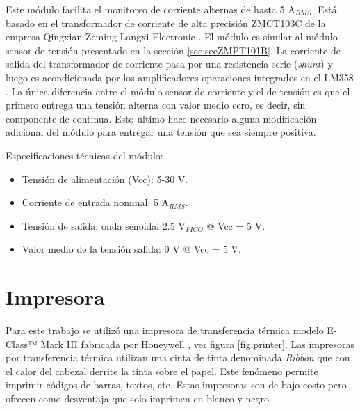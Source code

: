Este módulo facilita el monitoreo de corriente alternas de hasta 5 A$_{RMS}$. Está basado en el transformador de corriente de alta precisión ZMCT103C de la empresa Qingxian Zeming Langxi Electronic \citep{ZMCT103C_b}. El módulo es similar al módulo sensor de tensión presentado en la sección \ref{sec:secZMPT101B}. La corriente de salida del transformador de corriente pasa por una resistencia serie (\textit{shunt}) y luego es acondicionada por los amplificadores operaciones integrados en el LM358 \citep{LM358}. La única diferencia entre el módulo sensor de corriente y el de tensión es que el primero entrega una tensión alterna con valor medio cero, es decir, sin componente de continua. Esto último hace necesario alguna modificación adicional del módulo para entregar una tensión que sea siempre positiva.

Especificaciones técnicas del módulo: 
\begin{itemize}
\item Tensión de alimentación (Vcc): 5-30 V.
\item Corriente de entrada nominal: 5 A$_{RMS}$.
\item Tensión de salida: onda senoidal 2.5 V$_{PICO}$ @ Vcc = 5 V.
\item Valor medio de la tensión salida: 0 V @ Vcc = 5 V.
\end{itemize}

\section{Impresora}
\label{sec:Impre}
Para este trabajo se utilizó una impresora de transferencia térmica modelo E-Class™ Mark III fabricada por Honeywell \citep{printer_b}, ver figura \ref{fig:printer}. Las impresoras por transferencia térmica utilizan una cinta de tinta denominada \textit{Ribbon} que con el calor del cabezal derrite la tinta sobre el papel. Este fenómeno permite imprimir códigos de barras, textos, etc. Estas impresoras son de bajo costo pero ofrecen como desventaja que solo imprimen en blanco y negro.

